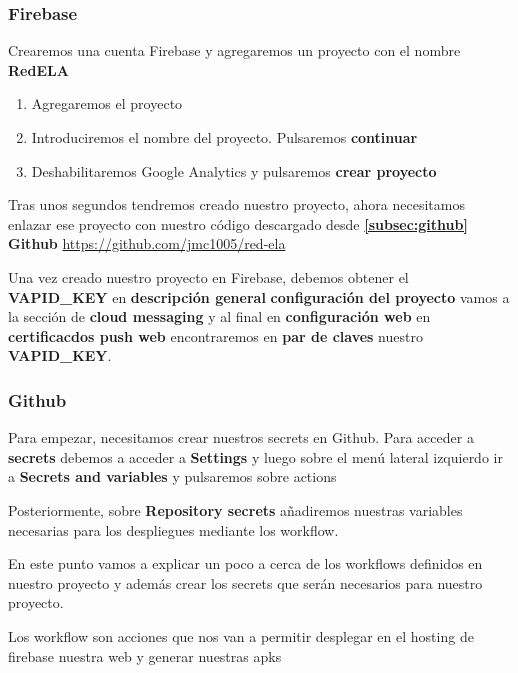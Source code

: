 \subsubsection{\label{subsec:firebase}Firebase}
Crearemos una cuenta Firebase y agregaremos un proyecto con el nombre \textbf{RedELA}
\begin{enumerate}
\item Agregaremos el proyecto 
\item Introduciremos el nombre del proyecto. Pulsaremos \textbf{continuar}
\item Deshabilitaremos Google Analytics y pulsaremos \textbf{crear proyecto}
\end{enumerate}

Tras unos segundos tendremos creado nuestro proyecto, ahora necesitamos enlazar ese proyecto con nuestro código descargado desde \textbf{\ref{subsec:github} Github} \url{https://github.com/jmc1005/red-ela}

Una vez creado nuestro proyecto en Firebase, debemos obtener el \textbf{VAPID\_KEY} en \textbf{descripción general} \textbf{configuración del proyecto} vamos a la sección de \textbf{cloud messaging} y al final en \textbf{configuración web} en \textbf{certificacdos push web} encontraremos en \textbf{par de claves} nuestro \textbf{VAPID\_KEY}.

\subsubsection{\label{subsec:github}Github}
Para empezar, necesitamos crear nuestros secrets en Github. Para acceder a \textbf{secrets} debemos a acceder a \textbf{Settings} y luego sobre el menú lateral izquierdo ir a \textbf{Secrets and variables} y pulsaremos sobre actions

Posteriormente, sobre \textbf{Repository secrets} añadiremos nuestras variables necesarias para los despliegues mediante los workflow.

En este punto vamos a explicar un poco a cerca de los workflows definidos en nuestro proyecto y además crear los secrets que serán necesarios para nuestro proyecto.

Los workflow son acciones que nos van a permitir desplegar en el hosting de firebase nuestra web y generar nuestras apks 

